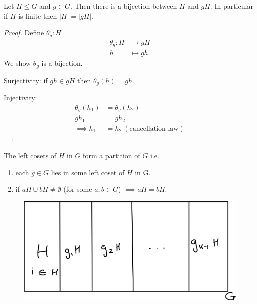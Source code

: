 \begin{lemma}
\protect\hypertarget{lem:nine}{}\label{lem:nine}Let \(H \leq G\) and \(g \in G\).
Then there is a bijection between \(H\) and \(gH\).
In particular if \(H\) is finite then \(|H| = |gH|\).
\end{lemma}

\begin{proof}
Define \(\theta_g : H\)
\begin{align*}
    \theta_g : H &\to gH \\
    h &\mapsto gh.
\end{align*}
We show \(\theta_g\) is a bijection.

Surjectivity: if \(gh \in gH\) then \(\theta_g(h) = gh\).

Injectivity: \begin{align*}
    \theta_g(h_1) &= \theta_g(h_2) \\
    g h_1 &= g h_2 \\
    \implies h_1 &= h_2 \ (\text{cancellation law})
\end{align*}
\end{proof}

\begin{lemma}
\protect\hypertarget{lem:ten}{}\label{lem:ten}

The left cosets of \(H\) in \(G\) form a partition of \(G\) i.e.

\begin{enumerate}
\def\labelenumi{\roman{enumi}.}
\item
  each \(g \in G\) lies in some left coset of \(H\) in G.
\item
  if \(aH \cup bH \neq \emptyset\) (for some \(a, b \in G\)) \(\implies aH = bH\).
\end{enumerate}

\end{lemma}

\begin{figure}

{\centering \includegraphics{figures/03-cosets} 

}

\end{figure}

